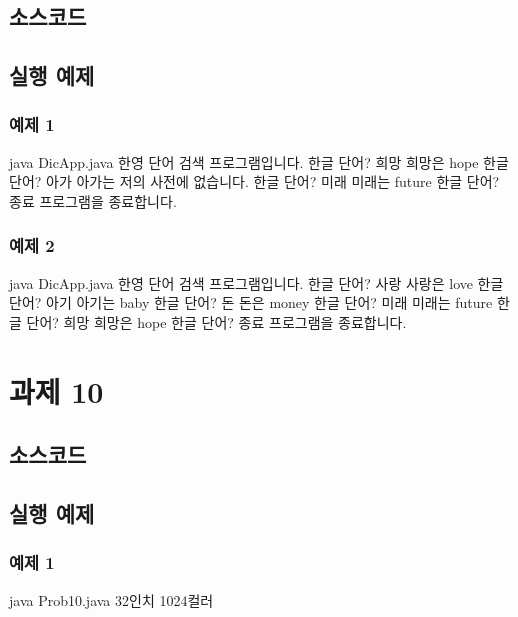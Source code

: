\documentclass{article}
\theoremstyle{nonumberplain}
\begin{document}
\subsection{소스코드}
\subsection{실행 예제}
\subsubsection{예제 1}
\begin{console}
java DicApp.java
한영 단어 검색 프로그램입니다.
한글 단어? 희망
희망은 hope
한글 단어? 아가
아가는 저의 사전에 없습니다.
한글 단어? 미래
미래는 future
한글 단어? 종료
프로그램을 종료합니다.
\end{console}
\subsubsection{예제 2}
\begin{console}
java DicApp.java
한영 단어 검색 프로그램입니다.
한글 단어? 사랑
사랑은 love
한글 단어? 아기
아기는 baby
한글 단어? 돈
돈은 money
한글 단어? 미래
미래는 future
한글 단어? 희망
희망은 hope
한글 단어? 종료
프로그램을 종료합니다.
\end{console}



\section{과제 10}
\subsection{소스코드}
\subsection{실행 예제}
\subsubsection{예제 1}
\begin{console}
java Prob10.java
32인치 1024컬러
\end{console}
\end{document}
